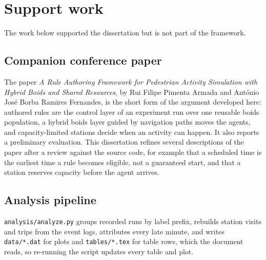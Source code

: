 \setlength{\floatsep}{8pt plus 2pt minus 2pt}
\setlength{\textfloatsep}{10pt plus 2pt minus 2pt}
\setlength{\intextsep}{8pt plus 2pt minus 2pt}
\renewcommand{\topfraction}{0.9}
\renewcommand{\bottomfraction}{0.8}
\renewcommand{\textfraction}{0.07}
\renewcommand{\floatpagefraction}{0.85}
\setcounter{topnumber}{4}
\setcounter{bottomnumber}{3}
\setcounter{totalnumber}{6}

\chapter{Support work}\label{app:support}
\begingroup\sloppy

The work below supported the dissertation but is not part of the framework.

\section{Companion conference paper}\label{app:support-paper}

The paper \emph{A Rule Authoring Framework for Pedestrian Activity Simulation with Hybrid Boids and Shared Resources}, by Rui Filipe Pimenta Armada and Ant\'onio Jos\'e Borba Ramires Fernandes, is the short form of the argument developed here: authored rules are the control layer of an experiment run over one reusable boids population, a hybrid boids layer guided by navigation paths moves the agents, and capacity-limited stations decide when an activity can happen. It also reports a preliminary evaluation. This dissertation refines several descriptions of the paper after a review against the source code, for example that a scheduled time is the earliest time a rule becomes eligible, not a guaranteed start, and that a station reserves capacity before the agent arrives.

\section{Analysis pipeline}\label{app:support-analysis}

\texttt{analysis/analyze.py} groups recorded runs by label prefix, rebuilds station visits and trips from the event logs, attributes every late minute, and writes \texttt{data/*.dat} for plots and \texttt{tables/*.tex} for table rows, which the document reads, so re-running the script updates every table and plot.

\par\endgroup
